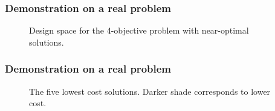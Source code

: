 \begin{frame}
    \frametitle{Demonstration on a real problem}

    \begin{figure}
        \centering 
        \resizebox{0.9\columnwidth}{!}{}
        \caption{Design space for the 4-objective problem with near-optimal solutions.}
        \label{fig:4-obj-design-space}
    \end{figure}

\end{frame}

\begin{frame}
    \frametitle{Demonstration on a real problem}

    \begin{figure}
        \centering 
        \resizebox{0.9\columnwidth}{!}{}
        \caption{The five lowest cost solutions. Darker shade corresponds to lower cost.}
        \label{fig:4-obj-design-space-total-cost}
    \end{figure}

\end{frame}